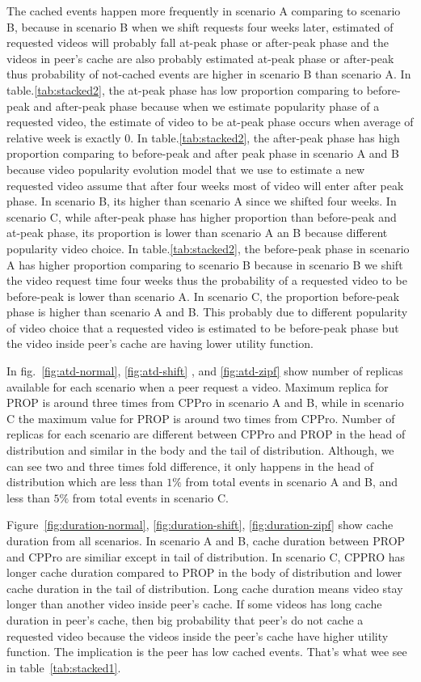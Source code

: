 The cached events happen more frequently in scenario A comparing to scenario B, because in scenario B when we shift requests four weeks later, estimated of requested videos will probably fall at-peak phase or after-peak phase and the videos in peer's cache are also probably estimated at-peak phase or after-peak thus probability of not-cached events are higher in scenario B than scenario A.
In table.\ref{tab:stacked2}, the at-peak phase has low proportion comparing to before-peak and after-peak phase because when we estimate popularity phase of a requested video, the estimate of video to be at-peak phase occurs when average of relative week is exactly $0$. 
In table.\ref{tab:stacked2}, the after-peak phase has high proportion comparing to before-peak and after peak phase in scenario A and B because video popularity evolution model that we use to estimate a new requested video assume that after four weeks most of video will enter after peak phase. 
In scenario B, its higher than scenario A since we shifted four weeks. 
In scenario C, while after-peak phase has higher proportion than before-peak and at-peak phase, its proportion is lower than scenario A an B because different popularity video choice.
In table.\ref{tab:stacked2}, the before-peak phase in scenario A has higher proportion comparing to scenario B because in scenario B we shift the video request time four weeks thus the probability of a requested video to be before-peak is lower than scenario A. 
In scenario C, the proportion before-peak phase is higher than scenario A and B. 
This probably due to different popularity of video choice that a requested video is estimated to be before-peak phase but the video inside peer's cache are having lower utility function.

In fig.~\ref{fig:atd-normal}, \ref{fig:atd-shift} , and \ref{fig:atd-zipf} show number of replicas available for each scenario when a peer request a video.
Maximum replica for PROP is around three times from CPPro in scenario A and B, while in scenario C the maximum value for PROP is around two times from CPPro.
Number of replicas for each scenario are different between CPPro and PROP in the head of distribution and similar in the body and the tail of distribution. 
Although, we can see two and three times fold difference, it only happens in the head of distribution which are less than $1\%$ from total events in scenario A and B, and less than $5\%$ from total events in scenario C.

Figure~\ref{fig:duration-normal}, \ref{fig:duration-shift}, \ref{fig:duration-zipf} show cache duration from all scenarios.  
In scenario A and B, cache duration between PROP and CPPro are similiar except in tail of distribution. 
In scenario C, CPPRO has longer cache duration compared to PROP in the body of distribution and lower cache duration in the tail of distribution.  
Long cache duration means video stay longer than another video inside peer's cache. 
If some videos has long cache duration in peer's cache, then big probability that peer's do not cache a requested video because the videos inside the peer's cache have higher utility function. 
The implication is the peer has low cached events.
That's what wee see in table~\ref{tab:stacked1}.



